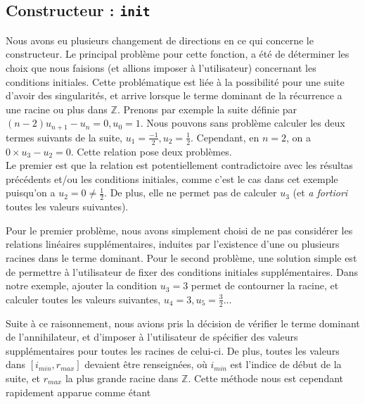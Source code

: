 \documentclass[12pt]{article}
\newlength{\charwidth}
\newcommand{\uline}{\underline{\hspace{2\charwidth}}}
\begin{document}
    \subsection{Constructeur : \texttt{\uline init\uline}}
        \label{sec:cons}
        Nous avons eu plusieurs changement de directions en ce qui concerne le constructeur.
        Le principal problème pour cette fonction, a été de déterminer les choix que nous
        faisions (et allions imposer à l'utilisateur) concernant les conditions initiales.
        Cette problématique est liée à la possibilité pour une suite d'avoir des
        \og singularités\fg, et arrive lorsque le terme dominant de la récurrence 
        a une racine ou plus dans $\mathbb Z$. Prenons par exemple la suite
        définie par $(n-2)u_{n+1} - u_n = 0, u_0 = 1$. Nous pouvons sans problème calculer
        les deux termes suivants de la suite, $u_1 = \frac{-1}{2}, u_2 = \frac{1}{2}$.
        Cependant, en $n=2$, on a $0\times u_3 - u_2=0$. Cette relation pose deux problèmes.\\
        Le premier est que la relation est potentiellement contradictoire avec les
        résultas précédents et/ou les conditions initiales, comme c'est le cas dans cet exemple
        puisqu'on a $u_2=0\ne\frac{1}{2}$. De plus, elle ne permet pas de calculer
        $u_3$ (et \textit{a fortiori} toutes les valeurs suivantes).\\
        \par Pour le premier problème, nous avons simplement choisi de ne pas
        considérer les relations linéaires supplémentaires, induites par l'existence d'une
        ou plusieurs racines dans le terme dominant. Pour le second problème, 
        une solution simple est de permettre à l'utilisateur de fixer des conditions initiales
        supplémentaires. Dans notre exemple, ajouter la condition $u_3 = 3$ permet de
        contourner la racine, et calculer toutes les valeurs suivantes,
        $u_4 = 3,u_5=\frac{3}{2}\ldots$\\
        \par Suite à ce raisonnement, nous avions pris la décision de vérifier le terme
        dominant de l'annihilateur, et d'imposer à l'utilisateur de spécifier des 
        valeurs supplémentaires pour toutes les racines de celui-ci. De plus,
        toutes les valeurs dans $[i_{min},r_{max}]$ devaient être renseignées,
        où $i_{min}$ est l'indice de début de la suite, et $r_{max}$ la plus grande racine 
        dans $\mathbb Z$. Cette méthode nous est cependant rapidement apparue comme étant
\end{document}
